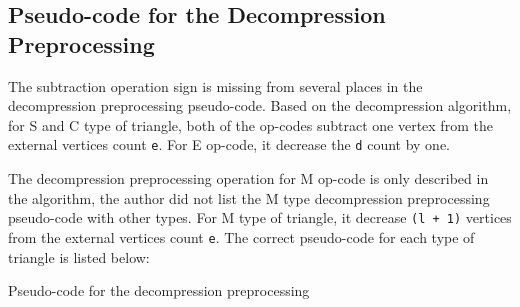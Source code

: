 \documentclass[onecolumn, 12pt]{article}
\begin{document}
{\begin{appendices}
\begin{algorithm}[H]
\begin{algorithmic}[1]
 
\REPEAT
     
     
     
     
 

 
 
 
 
 
\end{algorithmic}
\end{algorithm}


\subsection{Pseudo-code for the Decompression Preprocessing}
The subtraction operation sign is missing from several places in the decompression preprocessing pseudo-code. Based on the decompression algorithm, for S and C type of triangle, both of the op-codes subtract one vertex from the external vertices count \lstinline!e!. For E op-code, it decrease the \lstinline!d! count by one.

The decompression preprocessing operation for M op-code is only described in the algorithm, the author did not list the M type decompression preprocessing pseudo-code with other types. For M type of triangle, it decrease \lstinline!(l + 1)! vertices from the external vertices count \lstinline!e!. The correct pseudo-code for each type of triangle is listed below:

\begin{algorithm}[H]
\caption{Pseudo-code for the decompression preprocessing}
\begin{algorithmic}[1]
\end{algorithmic}
\end{algorithm}



\end{appendices}}
\end{document}
